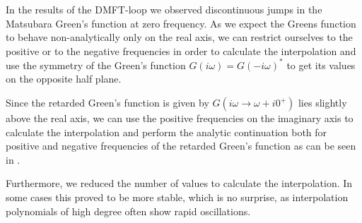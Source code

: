 \begin{appendix}
In the results of the DMFT-loop we observed discontinuous jumps in the Matsubara Green's function at zero frequency.
As we expect the Greens function to behave non-analytically only on the real axis, we can restrict ourselves to the positive or to the negative frequencies in order to calculate the interpolation and use the symmetry of the Green's function $G(iω)=G(-iω)^*$ to get its values on the opposite half plane.

Since the retarded Green's function is given by $G(i ω \to ω + i 0^+)$ lies slightly above the real axis, we can use the positive frequencies on the imaginary axis to calculate the interpolation and perform the analytic continuation both for positive and negative frequencies of the retarded Green's function as can be seen in .

Furthermore, we reduced the number of values to calculate the interpolation. In some cases this proved to be more stable, which is no surprise, as interpolation polynomials of high degree often show rapid oscillations.


\end{appendix}
